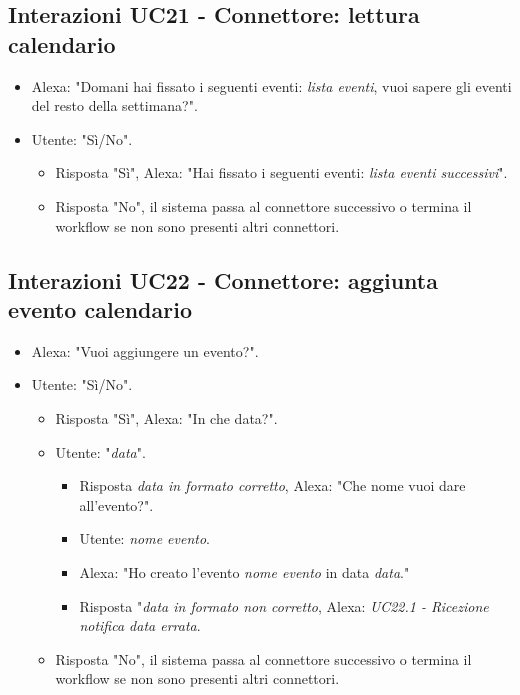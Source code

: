 \subsection{Interazioni UC21 - Connettore: lettura calendario}
\label{sec:connettore_lettura_calendario}
\begin{itemize}
        \item Alexa: "Domani hai fissato i seguenti eventi: {\it lista eventi}, vuoi sapere gli eventi del resto della settimana?".
        \item Utente: "Sì/No".
        \begin{itemize}
         \item{Risposta "Sì"}, Alexa: "Hai fissato i seguenti eventi: {\it lista eventi successivi}".
         \item{Risposta "No"}, il sistema passa al connettore successivo o termina il workflow se non sono presenti altri connettori.
         \end{itemize}
    \end{itemize}


\subsection{Interazioni UC22 - Connettore: aggiunta evento calendario}
\label{sec:connettore_evento_calendario}
 \begin{itemize}
        \item Alexa: "Vuoi aggiungere un evento?".
        \item Utente: "Sì/No".
        \begin{itemize}
         \item{Risposta "Sì"}, Alexa: "In che data?".
         \item Utente: "{\it data}".
         \begin{itemize}
             \item{Risposta {\it data in formato corretto}}, Alexa: "Che nome vuoi dare all'evento?".
             \item Utente: {\it nome evento}.
             \item Alexa: "Ho creato l'evento {\it nome evento} in data {\it data}."
            \item{Risposta "{\it data in formato non corretto}}, Alexa: {\it UC22.1 - Ricezione notifica data errata}.
         \end{itemize}
         \item{Risposta "No"}, il sistema passa al connettore successivo o termina il workflow se non sono presenti altri connettori.
         \end{itemize}
    \end{itemize}

